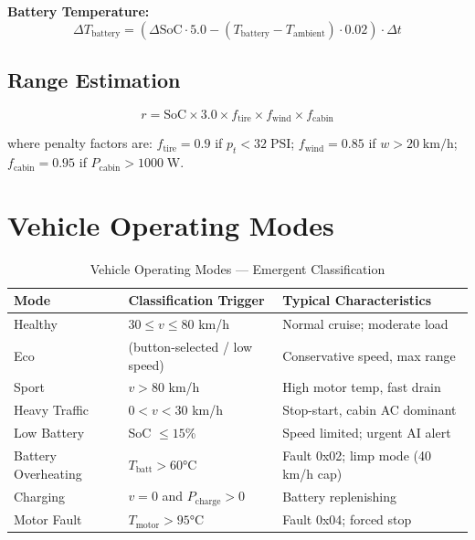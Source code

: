 \documentclass[12pt,a4paper]{report}
\begin{document}
\textbf{Battery Temperature:}
\begin{equation}
\Delta T_{\text{battery}} = (\Delta \text{SoC} \cdot 5.0 - (T_{\text{battery}} - T_{\text{ambient}}) \cdot 0.02) \cdot \Delta t
\label{eq:batt-temp}
\end{equation}

\subsection{Range Estimation}

\begin{equation}
r = \text{SoC} \times 3.0 \times f_{\text{tire}} \times f_{\text{wind}} \times f_{\text{cabin}}
\label{eq:range}
\end{equation}

where penalty factors are: $f_{\text{tire}} = 0.9$ if $p_t < 32\;\text{PSI}$; $f_{\text{wind}} = 0.85$ if $w > 20\;\text{km/h}$; $f_{\text{cabin}} = 0.95$ if $P_{\text{cabin}} > 1000\;\text{W}$.

\section{Vehicle Operating Modes}

\begin{table}[H]
\centering
\caption{Vehicle Operating Modes — Emergent Classification}
\label{tab:modes}
\begin{tabularx}{\textwidth}{L{3.8cm} L{2.8cm} X}
\toprule
\textbf{Mode} & \textbf{Classification Trigger} & \textbf{Typical Characteristics} \\
\midrule
Healthy & $30 \leq v \leq 80$ km/h & Normal cruise; moderate load \\
Eco & (button-selected / low speed) & Conservative speed, max range \\
Sport & $v > 80$ km/h & High motor temp, fast drain \\
Heavy Traffic & $0 < v < 30$ km/h & Stop-start, cabin AC dominant \\
Low Battery & SoC $\leq 15$\% & Speed limited; urgent AI alert \\
Battery Overheating & $T_{\text{batt}} > 60$°C & Fault 0x02; limp mode (40 km/h cap) \\
Charging & $v = 0$ and $P_{\text{charge}} > 0$ & Battery replenishing \\
Motor Fault & $T_{\text{motor}} > 95$°C & Fault 0x04; forced stop \\
\bottomrule
\end{tabularx}
\end{table}
\end{document}

